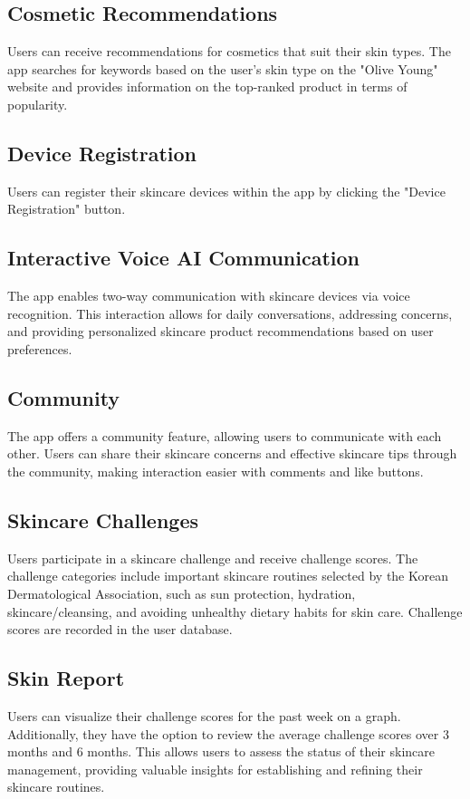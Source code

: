 \documentclass[conference]{IEEEtran}
\begin{document}
\subsection{Cosmetic Recommendations}
Users can receive recommendations for cosmetics that suit their skin types. The app searches for keywords based on the user's skin type on the "Olive Young" website and provides information on the top-ranked product in terms of popularity.\\
\subsection{Device Registration}
Users can register their skincare devices within the app by clicking the "Device Registration" button. \\
\subsection{Interactive Voice AI Communication}
The app enables two-way communication with skincare devices via voice recognition. This interaction allows for daily conversations, addressing concerns, and providing personalized skincare product recommendations based on user preferences.\\
\subsection{Community}
The app offers a community feature, allowing users to communicate with each other. Users can share their skincare concerns and effective skincare tips through the community, making interaction easier with comments and like buttons. \\
\subsection{Skincare Challenges}
Users participate in a skincare challenge and receive challenge scores. The challenge categories include important skincare routines selected by the Korean Dermatological Association, such as sun protection, hydration, skincare/cleansing, and avoiding unhealthy dietary habits for skin care. Challenge scores are recorded in the user database. \\
\subsection{Skin Report}
Users can visualize their challenge scores for the past week on a graph. Additionally, they have the option to review the average challenge scores over 3 months and 6 months. This allows users to assess the status of their skincare management, providing valuable insights for establishing and refining their skincare routines.\\
\end{document}

